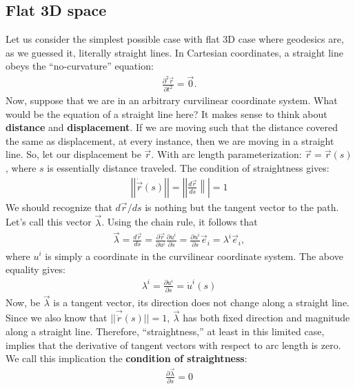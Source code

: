 \documentclass{book}
\theoremstyle{definition}
\begin{document}
\subsection{Flat 3D space}
Let us consider the simplest possible case with flat 3D case where geodesics are, as we guessed it, literally straight lines. In Cartesian coordinates, a straight line obeys the ``no-curvature'' equation:
\begin{align*}
\frac{\partial^2 \vec{r}}{\partial t^2} = \vec{0}.
\end{align*}
Now, suppose that we are in an arbitrary curvilinear coordinate system. What would be the equation of a straight line here? It makes sense to think about \textbf{distance} and \textbf{displacement}. If we are moving such that the distance covered the same as displacement, at every instance, then we are moving in a straight line. So, let our displacement be $\vec{r}$. With arc length parameterization: $\vec{r} = \vec{r}(s)$, where $s$ is essentially distance traveled. The condition of straightness gives:
\begin{align*}
\boxed{\left|\left| \dot{\vec{r}}(s) \right|\right| = \left|\left| \frac{d\vec{r}}{ds} \right\|\right| = 1 }
\end{align*}
We should recognize that $d\vec{r}/ds$ is nothing but the tangent vector to the path. Let's call this vector $\vec{\lambda}$. Using the chain rule, it follows that
\begin{align*}
\vec{\lambda} = \frac{d\vec{r}}{ds} = \frac{\partial \vec{r}}{\partial u^i}\frac{\partial u^i}{\partial s} = \frac{\partial u^i}{\partial s}\vec{e}_i = \lambda^i\vec{e}_i,
\end{align*}
where $u^i$ is simply a coordinate in the curvilinear coordinate system. The above equality gives:
\begin{align*}
\boxed{\lambda^i = \frac{\partial u^i}{\partial s} = \dot{u}^i(s)}
\end{align*}
Now, be $\vec{\lambda}$ is a tangent vector, its direction does not change along a straight line. Since we also know that $\vert\vert \vec{\dot{r}}(s) \vert\vert = 1$, $\vec{\lambda}$ has both fixed direction and magnitude along a straight line. Therefore, ``straightness,'' at least in this limited case, implies that the derivative of tangent vectors with respect to arc length is zero. We call this implication the \textbf{condition of straightness}:
\begin{align*}
\boxed{\frac{\partial \vec{\lambda}}{\partial s} = 0}
\end{align*}
\end{document}
